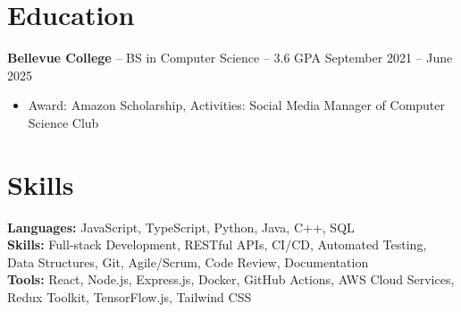 \documentclass[11pt]{article}       %
\begin{document}

\vspace{-18.5pt}

\section*{Education}
\textbf{Bellevue College} -- BS in Computer Science -- 3.6 GPA \hfill September 2021 -- June 2025\\
\vspace{-9pt}
\begin{itemize}
  \item Award: Amazon Scholarship, Activities: Social Media Manager of Computer Science Club
\end{itemize}

\vspace{-18.5pt}

\section*{Skills}
\textbf{Languages:} JavaScript, TypeScript, Python, Java, C++, SQL\\
\textbf{Skills:} Full-stack Development, RESTful APIs, CI/CD, Automated Testing, Data Structures, Git, Agile/Scrum, Code Review, Documentation\\
\textbf{Tools:} React, Node.js, Express.js, Docker, GitHub Actions, AWS Cloud Services, Redux Toolkit, TensorFlow.js, Tailwind CSS\\

\vspace{-6.5pt}
\end{document}
